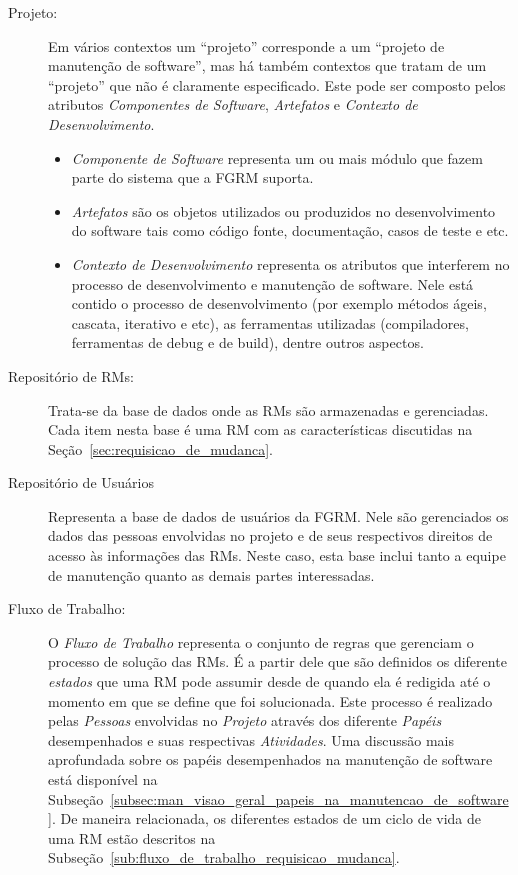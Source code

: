 \begin{description}
    \item[Projeto:] Em vários contextos um ``projeto'' corresponde a um
        ``projeto de manutenção de software'', mas há também contextos que
        tratam de um ``projeto'' que não é claramente especificado. Este pode
        ser composto pelos atributos \textit{Componentes de Software},
        \textit{Artefatos} e \textit{Contexto de Desenvolvimento}.
		\begin{itemize}
			\item  \textit{Componente de Software} representa um ou mais módulo
				que fazem parte do sistema que a FGRM suporta.
			\item \textit{Artefatos} são os objetos utilizados ou produzidos no
				desenvolvimento do software tais como código fonte,
				documentação, casos de teste e etc.
			\item \textit{Contexto de Desenvolvimento} representa os atributos
				que interferem no processo de desenvolvimento e manutenção de
				software. Nele está contido o processo de desenvolvimento (por
				exemplo métodos ágeis, cascata, iterativo e etc), as ferramentas
				utilizadas (compiladores, ferramentas de debug e de build), dentre
                outros aspectos.
		\end{itemize}
	\item[Repositório de RMs:] Trata-se da base de dados onde as RMs são
		armazenadas e gerenciadas. Cada item nesta base é uma RM com as
		características discutidas na Seção~\ref{sec:requisicao_de_mudanca}.
    \item[Repositório de Usuários] Representa a base de dados de usuários da
        FGRM\@. Nele são gerenciados os dados das pessoas envolvidas no projeto
        e de seus respectivos direitos de acesso às informações das RMs. Neste
        caso, esta base inclui tanto a equipe de manutenção quanto as demais
        partes interessadas.
	\item[Fluxo de Trabalho:] O \textit{Fluxo de Trabalho} representa o conjunto
		de regras que gerenciam o processo de solução das RMs\@. É a partir
		dele que são definidos os diferente \textit{estados} que uma RM pode
		assumir desde de quando ela é redigida até o momento em que se define
		que foi solucionada. Este processo é realizado pelas \textit{Pessoas}
		envolvidas no \textit{Projeto} através dos diferente \textit{Papéis}
		desempenhados e suas respectivas \textit{Atividades}. Uma discussão mais
		aprofundada sobre os papéis desempenhados na manutenção de software está
		disponível na
		Subseção~\ref{subsec:man_visao_geral_papeis_na_manutencao_de_software}.
		De maneira relacionada, os diferentes estados de um ciclo de vida de uma
		RM estão descritos na
		Subseção~\ref{sub:fluxo_de_trabalho_requisicao_mudanca}.
    \end{description}

